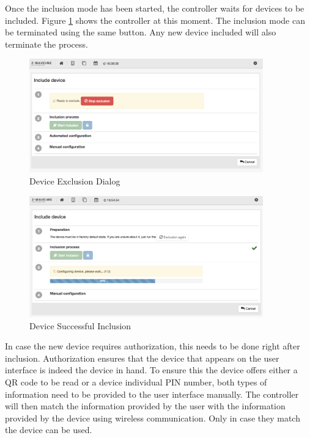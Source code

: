 Once the inclusion mode has been started, the controller waits for devices to be 
included. Figure \ref{incl1} shows the controller at this moment. The inclusion mode can 
be terminated using the same button. Any new device included will also terminate the process.

\begin{figure}
\begin{center}
\includegraphics[width=0.9\textwidth]{pngs/cap4/incl1.png}
\caption{\zwave Device Exclusion Dialog}
\label{incl1}
\end{center}
\end{figure}

\begin{figure}
\begin{center}
\includegraphics[width=0.9\textwidth]{pngs/cap4/incl2.png}
\caption{\zwave Device Successful Inclusion}
\label{incl2}
\end{center}
\end{figure}

In case the new device requires authorization, this needs to be done 
right after inclusion.
Authorization ensures that the device that appears on the user interface is indeed the 
device in hand. To ensure this the device offers either a QR code to be read or a 
device individual PIN number, both types of information need to be provided to the user 
interface manually.
The controller will then match the information provided by the user with the information 
provided by the device using wireless communication. Only in case they match the device 
can be used.

